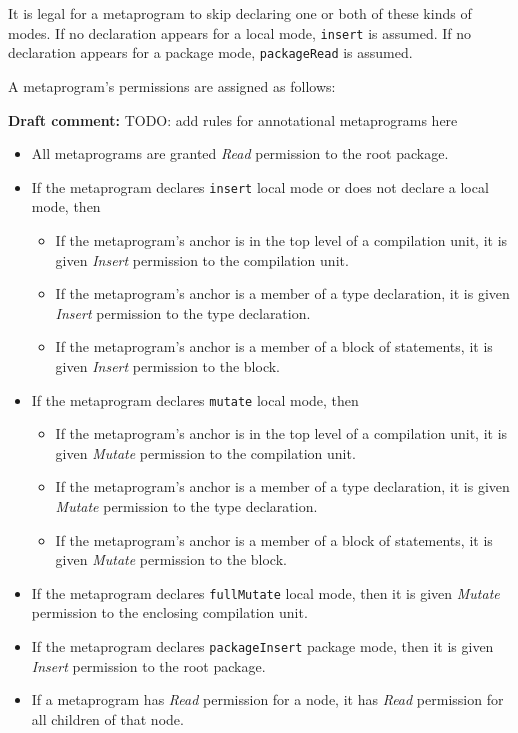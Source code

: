 \documentclass[a4paper,10pt]{report}
\newenvironment{draftcomment}{\vspace{0.5cm}\begin{itshape}\textbf{Draft comment: }}{\end{itshape}\vspace{0.5cm}}
\newcommand{\dc}[1]{\begin{draftcomment}#1\end{draftcomment}} %
\begin{document}
It is legal for a metaprogram to skip declaring one or both of these kinds of modes.  If no declaration appears for a local mode, \verb`insert` is assumed.  If no declaration appears for a package mode, \verb`packageRead` is assumed.

A metaprogram's permissions are assigned as follows:

\dc{TODO: add rules for annotational metaprograms here}
\begin{itemize}
    \item All metaprograms are granted \textit{Read} permission to the root package.
    \item If the metaprogram declares \verb`insert` local mode or does not declare a local mode, then
    \begin{itemize}
        \item If the metaprogram's anchor is in the top level of a compilation unit, it is given \textit{Insert} permission to the compilation unit.
        \item If the metaprogram's anchor is a member of a type declaration, it is given \textit{Insert} permission to the type declaration.
        \item If the metaprogram's anchor is a member of a block of statements, it is given \textit{Insert} permission to the block.
    \end{itemize}
    \item If the metaprogram declares \verb`mutate` local mode, then
    \begin{itemize}
        \item If the metaprogram's anchor is in the top level of a compilation unit, it is given \textit{Mutate} permission to the compilation unit.
        \item If the metaprogram's anchor is a member of a type declaration, it is given \textit{Mutate} permission to the type declaration.
        \item If the metaprogram's anchor is a member of a block of statements, it is given \textit{Mutate} permission to the block.
    \end{itemize}
    \item If the metaprogram declares \verb`fullMutate` local mode, then it is given \textit{Mutate} permission to the enclosing compilation unit.
    \item If the metaprogram declares \verb`packageInsert` package mode, then it is given \textit{Insert} permission to the root package.
    \item If a metaprogram has \textit{Read} permission for a node, it has \textit{Read} permission for all children of that node.

\end{itemize}
\end{document}
